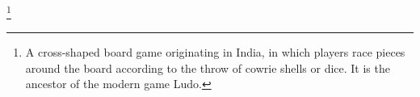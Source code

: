 \footnote{A cross-shaped board game originating in India, in which players race pieces around the board according to the throw of cowrie shells or dice. It is the ancestor of the modern game Ludo.}